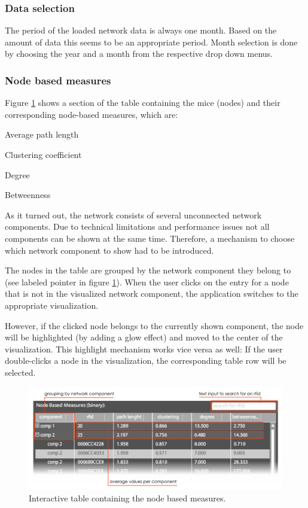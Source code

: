 \subsubsection*{Data selection}
The period of the loaded network data is always one month. Based on the amount of data this seems to be an appropriate period. Month selection is done by choosing the year and a month from the respective drop down menus.    

\subsubsection*{Node based measures}

Figure \ref{fig:node_based_measures} shows a section of the table containing the mice (nodes) and their corresponding node-based measures, which are:

\begin{mylist}
\item Average path length
\item Clustering coefficient
\item Degree
\item Betweenness
\end{mylist}

As it turned out, the network consists of several unconnected network components. Due to technical limitations and performance issues not all components can be shown at the same time. Therefore, a mechanism to choose which network component to show had to be introduced.

The nodes in the table are grouped by the network component they belong to (see labeled pointer in figure \ref{fig:node_based_measures}). When the user clicks on the entry for a node that is not in the visualized network component, the application switches to the appropriate visualization.

However, if the clicked node belongs to the currently shown component, the node will be highlighted (by adding a glow effect) and moved to the center of the visualization. This highlight mechanism works vice versa as well: If the user double-clicks a node in the visualization, the corresponding table row will be selected.

\begin{figure}[!htpb]
\begin{center}
  \includegraphics[width=\textwidth]{assets/pdf/node_based_measures.pdf}
  \caption[Table containing the node based measures]{Interactive table containing the node based measures.}
  \label{fig:node_based_measures}
\end{center}
\end{figure}

